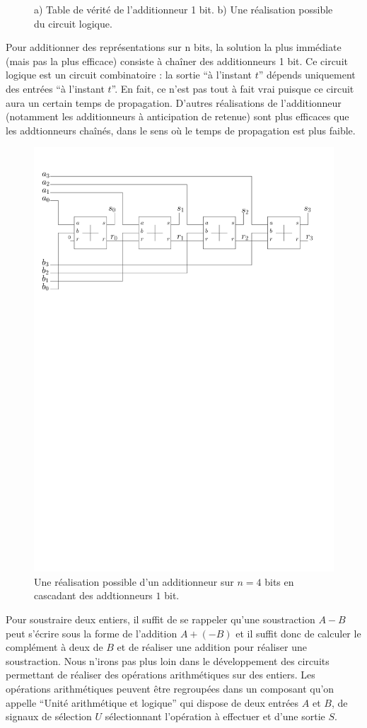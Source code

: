 \begin{figure}[htbp]
\begin{minipage}[c]{.46\linewidth}
   \end{minipage}
\caption{\label{fig:additionneur} a) Table de vérité de l'additionneur 1 bit. b) Une réalisation possible du circuit logique.}
\end{figure}

Pour additionner des représentations sur n bits, la solution la plus immédiate (mais pas la plus efficace) consiste à chaîner des additionneurs 1 bit. Ce circuit logique est un circuit combinatoire : la sortie ``à l'instant $t$'' dépends uniquement des entrées ``à l'instant $t$''. En fait, ce n'est pas tout à fait vrai puisque ce circuit aura un certain temps de propagation. D'autres réalisations de l'additionneur (notamment les additionneurs à anticipation de retenue) sont plus efficaces que les addtionneurs chaînés, dans le sens o{\`u} le temps de propagation est plus faible.

\begin{figure}
\centering\includegraphics[width=0.75\linewidth]{Figs/adder_n.pdf}
\caption{\label{fig:adder} Une réalisation possible d'un additionneur sur $n=4$ bits en cascadant des addtionneurs $1$ bit.}
\end{figure}

Pour soustraire deux entiers, il suffit de se rappeler qu'une soustraction $A-B$ peut s'écrire sous la forme de l'addition $A+(-B)$ et il suffit donc de calculer le complément à deux de $B$ et de réaliser une addition pour réaliser une soustraction. Nous n'irons pas plus loin dans le développement des circuits permettant de réaliser des opérations arithmétiques sur des entiers. Les opérations arithmétiques peuvent être regroupées dans un composant qu'on appelle ``Unité arithmétique et logique'' qui dispose de deux entrées $A$ et $B$, de signaux de sélection $U$ sélectionnant l'opération à effectuer et d'une sortie $S$.



